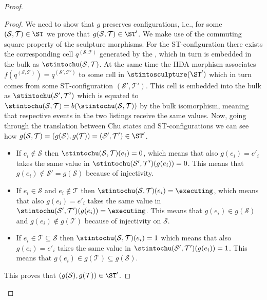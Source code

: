 \begin{proof}
\begin{proof}
        We need to show that $g$ preserves configurations, i.e., for some $(\mathcal{S},\mathcal{T})\in\ST$ we prove that $g(\mathcal{S},\mathcal{T}) \in \ST'$. We make use of the commuting square property of the sculpture morphisms. For the ST-configuration there exists the corresponding cell $q^{(\mathcal{S}, \mathcal{T})}$ generated by the \stintosculpture, which in turn is embedded in the bulk as $\stintochu(\mathcal{S},\mathcal{T})$. At the same time the HDA morphism associates $f(q^{(\mathcal{S},\mathcal{T})})=q^{(\mathcal{S}',\mathcal{T}')}$ to some cell in $\stintosculpture(\ST')$ which in turn comes from some ST-configuration $(\mathcal{S}',\mathcal{T}')$. This cell is embedded into the bulk as $\stintochu(\mathcal{S}',\mathcal{T}')$ which is equated to $\stintochu(\mathcal{S},\mathcal{T})=b(\stintochu(\mathcal{S},\mathcal{T}))$ by the bulk isomorphism, meaning that respective events in the two listings receive the same values. Now, going through the translation between Chu states and ST-configurations we can see how $g(\mathcal{S},\mathcal{T})=(g(\mathcal{S}),g(\mathcal{T}))=(\mathcal{S}',\mathcal{T}')\in\ST'$.

        \begin{itemize}
            \item If $e_{i} \not\in \mathcal{S}$ then $\stintochu(\mathcal{S},\mathcal{T})(e_{i})=0$, which means that also $g(e_{i})=e'_{i}$ takes the same value in $\stintochu(\mathcal{S}',\mathcal{T}')(g(e_{i}))=0$. This means that $g(e_{i})\not\in \mathcal{S}'=g(\mathcal{S})$ because of injectivity.
            \item If $e_{i}\in \mathcal{S}$ and $e_{i} \not\in \mathcal{T}$ then $\stintochu(\mathcal{S},\mathcal{T})(e_{i})=\executing$, which means that also $g(e_{i})=e'_{i}$ takes the same value in $\stintochu(\mathcal{S}',\mathcal{T}')(g(e_{i}))=\executing$. This means that $g(e_{i})\in g(\mathcal{S})$ and $g(e_{i}) \not\in g(\mathcal{T})$ because of injectivity on $\mathcal{S}$.
            \item If $e_{i}\in \mathcal{T} \subseteq \mathcal{S}$ then $\stintochu(\mathcal{S},\mathcal{T})(e_{i})=1$ which means that also $g(e_{i})=e'_{i}$ takes the same value in $\stintochu(\mathcal{S}',\mathcal{T}')(g(e_{i}))=1$. This means that $g(e_{i}) \in g(\mathcal{T}) \subseteq g(\mathcal{S})$.
        \end{itemize}
    
        This proves that $(g(\mathcal{S}),g(\mathcal{T}))\in\ST'$.
    
    \end{proof}


\end{proof}
